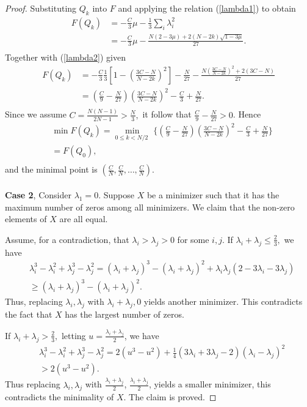 \documentclass[10pt,a4paper]{amsart}
\begin{document}
\begin{proof}
		Substituting $Q_k$ into $F$ and applying the relation (\ref{lambda1}) to obtain
		\begin{align*}
			F(Q_k)&=-\frac{C}{3}\mu -\frac{1}{3}\sum\limits_{i}{\lambda _{i}^{2}} \\ 
			& =-\frac{C}{3}\mu -\frac{N(2-3\mu )+2(N-2k)\sqrt{1-3\mu }}{27}. \\ 
		\end{align*}
		Together with (\ref{lambda2}) given
		\begin{align*}
			F(Q_k)&=-\frac{C}{3}\frac{1}{3}[1-{{\left( \frac{3C-N}{N-2k} \right)}^{2}}]-\frac{N}{27}-\frac{N{{\left( \frac{3C-N}{N-2k} \right)}^{2}}+2(3C-N)}{27} \\ 
			& =(\frac{C}{9}-\frac{N}{27}){{\left( \frac{3C-N}{N-2k} \right)}^{2}}-\frac{C}{3}+\frac{N}{27}. \\ 
		\end{align*}
		Since we assume $C=\frac{N(N-1)}{2N-1}>\frac{N}{3},$ it follow that $\frac{C}{9}-\frac{N}{27}>0$. Hence
		\begin{align*}
			& \min F(Q_k)=\underset{0\le k<{N}/{2}\;}{\mathop{\min }}\,\{(\frac{C}{9}-\frac{N}{27}){\left( \frac{3C-N}{N-2k} \right)^2}-\frac{C}{3}+\frac{N}{27}\} \\ 
			& =F(Q_0), \\ 
		\end{align*}
		and the minimal point is $\left( \frac{C}{N},\frac{C}{N},\ldots ,\frac{C}{N} \right).$\\\\
		\textbf{Case 2}, Consider ${\lambda }_1=0$.
		Suppose $X$ be a minimizer such that it has the maximum number of zeros among all minimizers. We claim that the non-zero elements of $X$ are all equal.
		
		Assume, for a contradiction, that ${\lambda }_i>{\lambda }_j>0$ for some $i,j$. If ${\lambda }_i+{\lambda }_j\le \frac{2}{3},$ we have
		\begin{align*}
			& \lambda _{i}^3-\lambda _{i}^2+\lambda _{j}^3-\lambda _{j}^2=({\lambda }_i+{\lambda }_j)^3-({\lambda }_i+{\lambda }_j)^2+{\lambda }_i{\lambda }_j(2-3{\lambda }_i-3{\lambda }_j) \\ 
			& \ge ({\lambda }_i+{\lambda }_j)^3-({\lambda }_i+{\lambda }_j)^2.
		\end{align*}
		Thus, replacing ${\lambda }_i,{\lambda }_j$ with ${\lambda }_i+{\lambda }_j,0$ yields another minimizer. This contradicts the fact that $X$ has the largest number of zeros.
		
		If  ${\lambda }_i+{\lambda }_j>\frac{2}{3},$ letting $u=\frac{{\lambda }_i+{\lambda }_j}{2}$, we have
		\begin{align*}
			& \lambda _{i}^3-\lambda _{i}^2+\lambda _{j}^3-\lambda _{j}^2=2(u^3-u^2)+\frac{1}{4}(3{\lambda }_i+3{\lambda }_j-2)({\lambda }_i-{\lambda }_j)^2 \\ 
			& >2(u^3-u^2). 
		\end{align*}
		Thus replacing ${\lambda }_i,{\lambda }_j$ with $\frac{{\lambda }_i+{\lambda }_j}{2}$, $\frac{{\lambda }_i+{\lambda }_j}{2}$, yields a smaller  minimizer, this contradicts the minimality of $X$. The claim is proved.
		

\end{proof}
\end{document}
